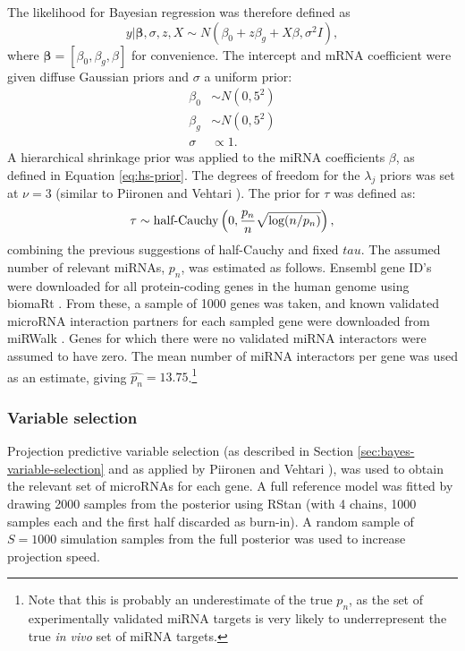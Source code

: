 The likelihood for Bayesian regression was therefore defined as
\begin{equation}
	y | \mathbf{\beta}, \sigma, z, X \sim N(\beta_0 + z \beta_g + X \beta, \sigma^2I),
\end{equation}
where $\mathbf{\beta} = [\beta_0, \beta_g, \beta]$ for convenience.
The intercept and mRNA coefficient were given diffuse Gaussian priors
and $\sigma$ a uniform prior:
\begin{subequations}
  \begin{align}
    \beta_0 & \sim N(0, 5^2) \\
    \beta_g & \sim N(0, 5^2) \\
    \sigma  & \propto 1.
  \end{align}
\end{subequations}
A hierarchical shrinkage prior was applied to the miRNA coefficients $\beta$,
as defined in Equation \eqref{eq:hs-prior}. The degrees of freedom for the
$\lambda_j$ priors was set at $\nu=3$ (similar to Piironen and Vehtari
\citep{Piironen2015}). The prior for $\tau$ was defined as:
\begin{equation}
    \tau \sim \textup{half-Cauchy} \left ( 0, \frac{p_n}{n}\sqrt{\textup{log}(n/p_n)} \right ),
\end{equation}
combining the previous suggestions of half-Cauchy and fixed $tau$.
The assumed number of relevant miRNAs, $p_n$, was estimated as follows.
Ensembl gene ID's were downloaded for all protein-coding genes in the human
genome using biomaRt \citep{biomaRt}. From these, a sample of 1000 genes was
taken, and known validated microRNA interaction partners for each sampled gene
were downloaded from miRWalk \citep{Dweep2015}. Genes for which there were no
validated miRNA interactors were assumed to have zero. The mean number of
miRNA interactors per gene was used as an estimate, giving
$\hat{p_n} = 13.75$.\footnote{Note that this is probably an underestimate of
the true $p_n$, as the set of experimentally validated miRNA targets is
very likely to underrepresent the true \emph{in vivo} set of miRNA targets.}



\subsubsection{Variable selection}\label{sec:methods-variable-selection}

Projection predictive variable selection (as described in Section
\ref{sec:bayes-variable-selection} and as applied by Piironen and Vehtari \citep{Piironen2015}),
was used to obtain the relevant set of microRNAs for each gene. A full
reference model was fitted by drawing 2000 samples from the posterior using
RStan (with 4 chains, 1000 samples each and the first half discarded as burn-in).
A random sample of $S=1000$ simulation samples from the full posterior was used
to increase projection speed.

